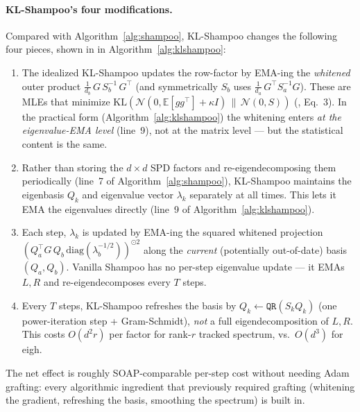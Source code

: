 \paragraph{KL-Shampoo's four modifications.} Compared with
Algorithm~\ref{alg:shampoo}, KL-Shampoo \citep{lin2025klshampoo} changes the
following four pieces, shown in  in Algorithm~\ref{alg:klshampoo}:
\begin{enumerate}
  \item {} The idealized KL-Shampoo updates
        the row-factor by EMA-ing the \emph{whitened} outer product
        $\frac{1}{d_b}\,G\,S_b^{-1}\,G^\top$ (and symmetrically $S_b$ uses
        $\frac{1}{d_a}\,G^\top S_a^{-1}G$). These are MLEs that minimize
        $\mathrm{KL}(\mathcal N(0,\mathbb E[gg^\top]+\kappa I)\,\|\,\mathcal N(0,S))$
        (\citealp{lin2025klshampoo}, Eq.~3). In the practical form
        (Algorithm~\ref{alg:klshampoo}) the whitening enters \emph{at the
        eigenvalue-EMA level} (line~9), not at the matrix level --- but the
        statistical content is the same.
  \item {} Rather than storing the $d\times d$ SPD factors and
        re-eigendecomposing them periodically (line~7 of
        Algorithm~\ref{alg:shampoo}), KL-Shampoo maintains the eigenbasis
        $Q_k$ and eigenvalue vector $\lambda_k$ separately at all times. This
        lets it EMA the eigenvalues directly (line~9 of
        Algorithm~\ref{alg:klshampoo}).
  \item {} Each step,
        $\lambda_k$ is updated by EMA-ing the squared whitened projection
        $(Q_a^\top G\,Q_b\,\mathrm{diag}(\lambda_b^{-1/2}))^{\odot 2}$ along
        the \emph{current} (potentially out-of-date) basis $(Q_a,Q_b)$.
        Vanilla Shampoo has no per-step eigenvalue update --- it EMAs $L,R$ and
        re-eigendecomposes every $T$ steps.
  \item {} Every $T$
        steps, KL-Shampoo refreshes the basis by
        $Q_k \gets \texttt{QR}(S_k Q_k)$ (one power-iteration step + Gram-Schmidt),
        \emph{not} a full eigendecomposition of $L,R$. This costs $O(d^2 r)$
        per factor for rank-$r$ tracked spectrum, vs.\ $O(d^3)$ for eigh.
\end{enumerate}
The net effect is roughly SOAP-comparable per-step cost
\citep{vyas2024soap,lin2025klshampoo} without needing Adam grafting: every
algorithmic ingredient that previously required grafting (whitening the
gradient, refreshing the basis, smoothing the spectrum) is built in.

